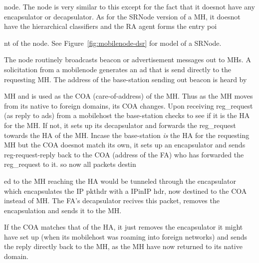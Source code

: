{ node. The  node is very similar to this except for the fact that it doesnot have any encapsulator or decapsulator. As for the SRNode version of a MH, it doesnot have the hierarchical classifiers and the RA agent forms the entry poi











nt of the node. See Figure~\ref{fig:mobilenode-dsr} for model of a SRNode.

The  node routinely broadcasts beacon or advertisement messages out to MHs. A solicitation from a mobilenode generates an ad that is send directly to the requesting MH. The address of the base-station sending out beacon is heard by 











MH and is used as the COA (care-of-address) of the MH. Thus as the MH moves from its native to foreign domains, its COA changes.
Upon receiving  reg\_request (as reply to ads) from a mobilehost the base-station checks to see if it is the HA for the MH. If not, it sets up its decapsulator and forwards the reg\_request towards the HA of the MH. 
Incase the base-station {\em is} the HA for the requesting MH but the COA doesnot match its own, it sets up an encapsulator and sends reg-request-reply back to the COA (address of the FA) who has forwarded the reg\_request to it. so now all packets destin











ed to the MH reaching the HA would be tunneled through the encapsulator which encapsulates the IP pkthdr with a IPinIP hdr, now destined to the COA instead of MH. The FA's decapsulator recives this packet, removes the encapsulation and sends it to the MH.












If the COA matches that of the HA, it just removes the encapsulator it might have set up (when its mobilehost was roaming into foreign networks) and sends the reply directly back to the MH, as the MH have now returned to its native domain.

}
